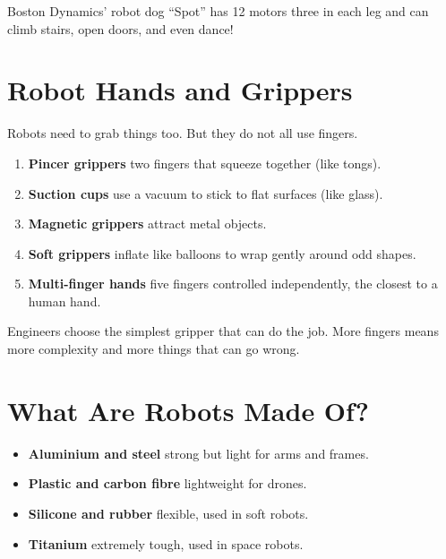 \begin{funfact}
  Boston Dynamics' robot dog ``Spot'' has 12 motors \textemdash{}
  three in each leg \textemdash{} and can climb stairs, open doors, and even dance!
\end{funfact}

\sectionrule

\section*{Robot Hands and Grippers}

Robots need to grab things too. But they do not all use fingers.

\begin{enumerate}
  \item \textbf{Pincer grippers} \textemdash{} two fingers that squeeze together (like tongs).
  \item \textbf{Suction cups} \textemdash{} use a vacuum to stick to flat surfaces (like glass).
  \item \textbf{Magnetic grippers} \textemdash{} attract metal objects.
  \item \textbf{Soft grippers} \textemdash{} inflate like balloons to wrap gently around odd shapes.
  \item \textbf{Multi-finger hands} \textemdash{} five fingers controlled independently, the closest to a human hand.
\end{enumerate}

\begin{bigidea}
  Engineers choose the simplest gripper that can do the job.
  More fingers means more complexity \textemdash{} and more things that can go wrong.
\end{bigidea}

\sectionrule

\section*{What Are Robots Made Of?}

\begin{itemize}
  \item \textbf{Aluminium and steel} \textemdash{} strong but light for arms and frames.
  \item \textbf{Plastic and carbon fibre} \textemdash{} lightweight for drones.
  \item \textbf{Silicone and rubber} \textemdash{} flexible, used in soft robots.
  \item \textbf{Titanium} \textemdash{} extremely tough, used in space robots.
\end{itemize}

